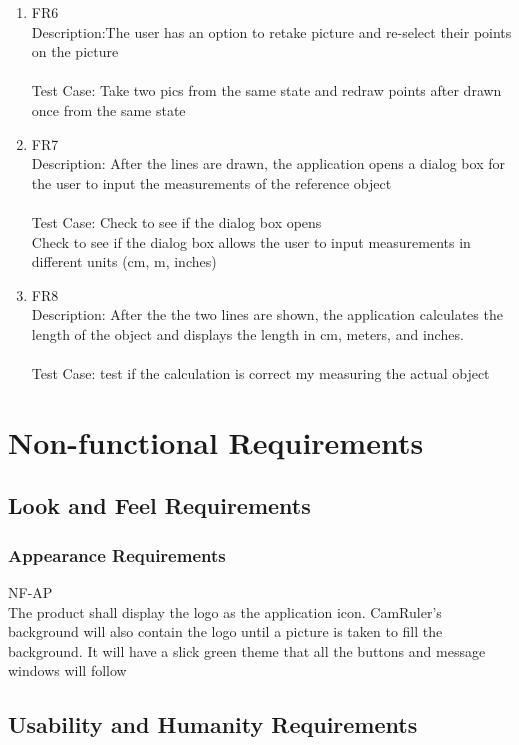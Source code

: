 \documentclass[12pt, titlepage]{article}
\begin{document}
\begin{enumerate}{}{}
\item FR6 \\Description:The user has an option to retake picture and re-select their points on the picture \\   \\          
 Test Case: Take two pics from the same state and redraw points after drawn once  from the same state

\item FR7 \\Description: After the lines are drawn, the application opens a dialog box for the user to input the measurements of the reference object \\ \\
 Test Case: Check to see if the dialog box opens\\
  Check to see if the dialog box allows the user to input measurements in different units (cm, m, inches)

\item FR8 \\Description: After the the two lines are shown, the application calculates the length of the object and displays the length in cm, meters, and inches. \\	  \\
 Test Case: test if the calculation is correct my measuring the actual object \\

\end{enumerate}
\section{Non-functional Requirements}

\subsection{Look and Feel Requirements}
\subsubsection{Appearance Requirements}
NF-AP \\
The product shall display the logo as the application icon. CamRuler’s background will also contain the logo until a picture is taken to fill the background. It will have a slick green theme that all the buttons and message windows will follow


\subsection{Usability and Humanity Requirements}
\end{document}
